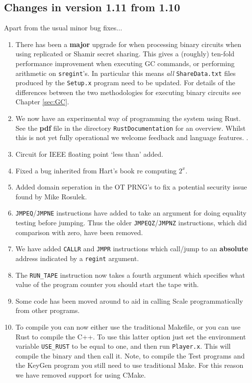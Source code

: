 \subsection{Changes in version 1.11 from 1.10}
Apart from the usual minor bug fixes...
\begin{enumerate}
\item There has been a {\bf major} upgrade for when processing binary
	circuits when using replicated or Shamir secret sharing.
	This gives a (roughly) ten-fold performance improvement
	when executing GC commands, or performing arithmetic on
	\verb+sregint+'s.
	In particular this means {\em all} \verb|ShareData.txt|
	files produced by the \verb|Setup.x| program need to
	be updated.
	For details of the differences between the two methodologies
	for executing binary circuits see Chapter \ref{sec:GC}.
\item We now have an experimental way of programming the system
	using Rust. See the {\bf pdf} file in the directory \verb|RustDocumentation|
	for an overview. Whilst this is not yet fully operational
	we welcome feedback and language features.
	.
\item Circuit for IEEE floating point `less than' added.
\item Fixed a bug inherited from Hart's book re computing $2^x$.
\item Added domain seperation in the OT PRNG's to fix a potential
	security issue found by Mike Rosulek.
\item \verb|JMPEQ|/\verb|JMPNE| instructions have added to take
	an argument for doing equality testing before jumping.
	Thus the older \verb|JMPEQZ|/\verb|JMPNZ| instructions,
	which did comparison with zero, have been removed.
\item We have added \verb|CALLR| and \verb|JMPR| instructions which
	call/jump to an {\bf absolute} address indicated by
      a \verb|regint| argument.
\item The \verb|RUN_TAPE| instruction now takes a fourth argument which
	specifies what value of the program counter you should start the
	tape with.
\item Some code has been moved around to aid in calling Scale programmatically from other programs.
\item To compile you can now either use the traditional Makefile, or
	you can use Rust to compile the C++. 
	To use this latter option just set the environment variable
	\verb|USE_RUST| to be equal to one, and then run \verb|Player.x|.
	This will compile the binary and then call it.
	Note, to compile the Test programs and the KeyGen program you
	still need to use traditional Make.
	For this reason we have removed support for using CMake.
\end{enumerate}

